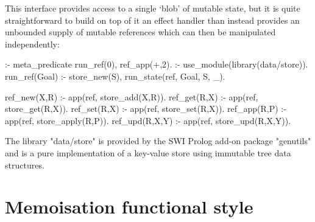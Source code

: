 This interface provides access to a single `blob' of mutable state, but it is quite 
straightforward to build on top of it an effect handler than instead provides an 
unbounded supply of mutable references which can then be manipulated independently:
\begin{prolog-framed}[name=ccstate]
	:- meta_predicate run_ref(0), ref_app(+,2).
	:- use_module(library(data/store)).
	run_ref(Goal) :-
		 store_new(S),
		 run_state(ref, Goal, S, _).

	ref_new(X,R) :- app(ref, store_add(X,R)).
	ref_get(R,X) :- app(ref, store_get(R,X)).
	ref_set(R,X) :- app(ref, store_set(R,X)).
	ref_app(R,P) :- app(ref, store_apply(R,P)).
	ref_upd(R,X,Y) :- app(ref, store_upd(R,X,Y)).
\end{prolog-framed}
The library "data/store" is provided by the SWI Prolog add-on package "genutils"
and is a pure implementation of a key-value store using immutable tree data structures.

\section{Memoisation functional style}

